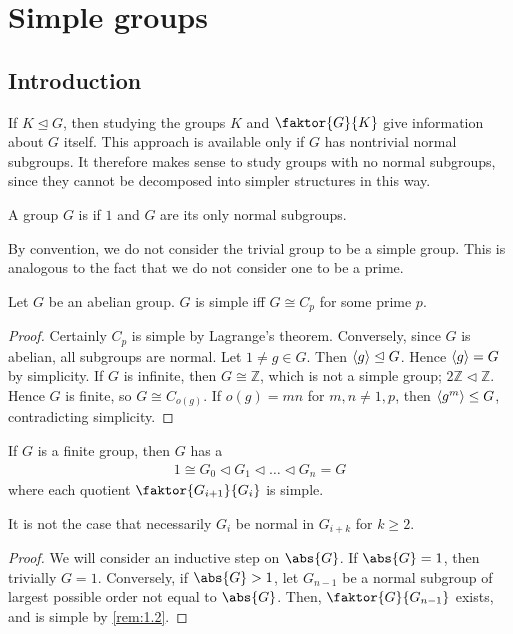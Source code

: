 \section{Simple groups}

\subsection{Introduction}
If $K \trianglelefteq G$, then studying the groups $K$ and $\faktor{G}{K}$ give information about $G$ itself.
This approach is available only if $G$ has nontrivial normal subgroups.
It therefore makes sense to study groups with no normal subgroups, since they cannot be decomposed into simpler structures in this way.

\begin{definition}
	A group $G$ is  if $\qty{1}$ and $G$ are its only normal subgroups.
\end{definition}

By convention, we do not consider the trivial group to be a simple group.
This is analogous to the fact that we do not consider one to be a prime.

\begin{lemma} \label{lem:1.3}
	Let $G$ be an abelian group.
	$G$ is simple iff $G \cong C_p$ for some prime $p$.
\end{lemma}

\begin{proof}
	Certainly $C_p$ is simple by Lagrange's theorem.
	Conversely, since $G$ is abelian, all subgroups are normal.
	Let $1 \neq g \in G$.
	Then $\left\langle{} g \right\rangle \trianglelefteq G$.
	Hence $\left\langle{} g \right\rangle = G$ by simplicity.
	If $G$ is infinite, then $G \cong \mathbb Z$, which is not a simple group; $2\mathbb Z \triangleleft \mathbb Z$.
	Hence $G$ is finite, so $G \cong C_{o(g)}$.
	If $o(g) = mn$ for $m, n \neq 1, p$, then $\left\langle{} g^m \right\rangle \leq G$, contradicting simplicity.
\end{proof}

\begin{lemma} \label{lem:1.4}
	If $G$ is a finite group, then $G$ has a 
	\begin{align*}
		1 \cong G_0 \triangleleft G_1 \triangleleft \dots \triangleleft G_n = G
	\end{align*}
	where each quotient $\faktor{G_{i+1}}{G_i}$ is simple.
\end{lemma}

\begin{remark}
	It is not the case that necessarily $G_i$ be normal in $G_{i+k}$ for $k \geq 2$.
\end{remark}

\begin{proof}
	We will consider an inductive step on $\abs{G}$.
	If $\abs{G} = 1$, then trivially $G = 1$.
	Conversely, if $\abs{G} > 1$, let $G_{n-1}$ be a normal subgroup of largest possible order not equal to $\abs{G}$.
	Then, $\faktor{G}{G_{n-1}}$ exists, and is simple by \cref{rem:1.2}.
\end{proof}

